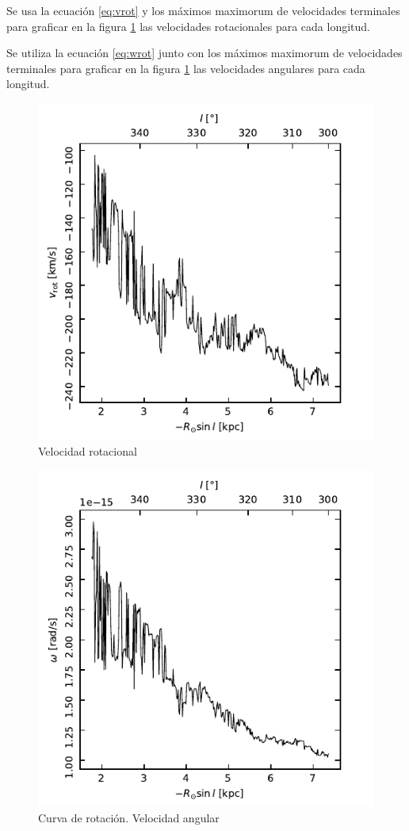 Se usa la ecuación \ref{eq:vrot} y los máximos maximorum de velocidades terminales para graficar en la figura \ref{fig:vrot} las velocidades rotacionales para cada longitud.

Se utiliza la ecuación \ref{eq:wrot} junto con los máximos maximorum de velocidades terminales para graficar en la figura \ref{fig:vrot} las velocidades angulares para cada longitud.

\begin{figure}[p]
	\includegraphics{rsc/vrot.pdf}
	\caption{Velocidad rotacional}
	\label{fig:vrot}
\end{figure}

\begin{figure}[p]
	\includegraphics{rsc/w.pdf}
	\caption{Curva de rotación. Velocidad angular}
	\label{fig:w}
\end{figure}